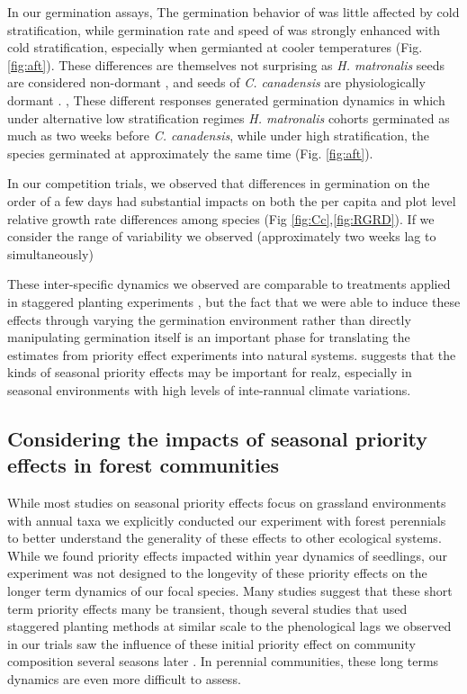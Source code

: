 \documentclass{article}\usepackage[]{graphicx}\usepackage[]{color}
\begin{document}
In our germination assays, The germination behavior of  was little affected by cold stratification, while germination rate and speed of  was strongly enhanced with cold stratification, especially when germianted at cooler temperatures (Fig. \ref{fig:aft}). These differences are themselves not surprising as \textit{H. matronalis} seeds are considered non-dormant \citep{}, and seeds of \textit{C. canadensis} are physiologically dormant \citep{}. , These different responses generated germination dynamics in which under alternative low stratification regimes \textit{H. matronalis} cohorts germinated as much as two weeks before \textit{C. canadensis}, while under high stratification, the species germinated at approximately the same time (Fig. \ref{fig:aft}). 

In our competition trials, we observed that differences in germination on the order of a few days had substantial impacts on both the per capita and plot level relative growth rate differences among species (Fig \ref{fig:Cc},\ref{fig:RGRD}). If we consider the range of variability we observed (approximately two weeks lag to simultaneously)

These inter-specific dynamics we observed are comparable to treatments applied in staggered planting experiments \citep{}, but the fact that we were able to induce these effects through varying the germination environment rather than directly manipulating germination itself is an important phase for translating the estimates from priority effect experiments into natural systems.  suggests that the kinds of seasonal priority effects may be important for realz, especially in seasonal environments with high levels of inte-rannual climate variations.


\subsection*{Considering the impacts of seasonal priority effects in forest communities}
While most studies on seasonal priority effects focus on grassland environments with annual taxa \citep{} we explicitly conducted our experiment with forest perennials to better understand the generality of these effects to other ecological systems. While we found priority effects impacted within year dynamics of seedlings, our experiment was not designed to the longevity of these priority effects on the longer term dynamics of our focal species.  Many studies suggest that these short term priority effects many be transient, though several studies that used staggered planting methods at similar scale to the phenological lags we observed in our trials saw the influence of these initial priority effect on community composition several seasons later \citep{}. In perennial communities, these long terms dynamics are even more difficult to assess.
\end{document}
